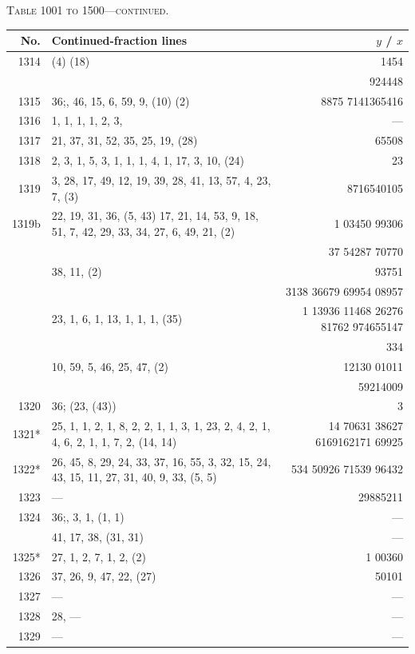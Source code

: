 \documentclass[11pt]{article}
\newcommand{\peheading}{%
  \begin{center}\small\textsc{Table 1001 to 1500---continued.}\end{center}
}
\begin{document}
\peheading
\renewcommand{\arraystretch}{1.15}
{\footnotesize
\begin{longtable}{|r|p{8.5cm}|r|}
\hline
\textbf{No.} & \textbf{Continued-fraction lines} & \textbf{$y$ \;/\; $x$}\\
\hline\endhead
1314   & (4) (18) & 1454 \\
       & & 924448 \\
\hline
1315   & $36$;\; 20, 46, 15, 6, 59, 9, (10) (2) & 8875 7141365416 \\
1316   & 1, 1, 1, 1, 2, 3, & --- \\
1317   & 21, 37, 31, 52, 35, 25, 19, (28) & 65508 \\
\hline
1318   & 2, 3, 1, 5, 3, 1, 1, 1, 4, 1, 17, 3, 10, (24) & 23 \\
1319   & 3, 28, 17, 49, 12, 19, 39, 28, 41, 13, 57, 4, 23, 7, (3) & 8716540105 \\
\hline
1319b  & 22, 19, 31, 36, (5, 43) 17, 21, 14, 53, 9, 18, 51, 7, 42, 29, 33, 34, 27, 6, 49, 21, (2) & 1 03450 99306 \\
       & & 37 54287 70770 \\
       & 38, 11, (2) & 93751 \\
       & & 3138 36679 69954 08957 \\
       & 23, 1, 6, 1, 13, 1, 1, 1, (35) & 1 13936 11468 26276 81762 974655147 \\
       & & 334 \\
       & 10, 59, 5, 46, 25, 47, (2) & 12130 01011 \\
       & & 59214009 \\
\hline
1320   & $36$;\; (23, (43)) & 3 \\
\hline
1321*  & 25, 1, 1, 2, 1, 8, 2, 2, 1, 1, 3, 1, 23, 2, 4, 2, 1, 4, 6, 2, 1, 1, 7, 2, (14, 14) & 14 70631 38627 6169162171 69925 \\
1322*  & 26, 45, 8, 29, 24, 33, 37, 16, 55, 3, 32, 15, 24, 43, 15, 11, 27, 31, 40, 9, 33, (5, 5) & 534 50926 71539 96432 \\
1323   & --- & 29885211 \\
\hline
1324   & $36$;\; 1, 3, 1, (1, 1) & --- \\
       & 41, 17, 38, (31, 31) & --- \\
\hline
1325*  & 27, 1, 2, 7, 1, 2, (2) & 1 00360 \\
1326   & 37, 26, 9, 47, 22, (27) & 50101 \\
1327   & --- & --- \\
1328   & 28, --- & --- \\
1329   & --- & --- \\

\end{longtable}}
\end{document}

